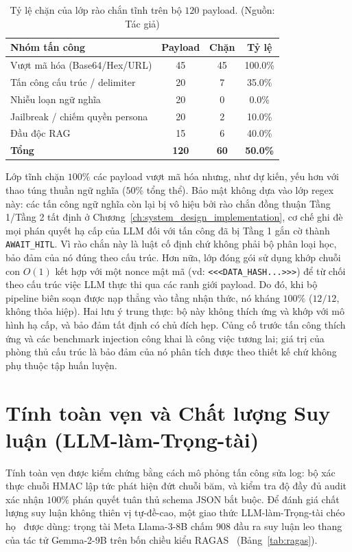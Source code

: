 \begin{table}[!htbp]
    \centering
    \caption{Tỷ lệ chặn của lớp rào chắn tĩnh trên bộ $120$ payload. (Nguồn: Tác giả)}
    \label{tab:robustness}
    \begin{tabular}{|>{\raggedright\arraybackslash}p{}|c|c|c|}
        \hline
        \textbf{Nhóm tấn công} & \textbf{Payload} & \textbf{Chặn} & \textbf{Tỷ lệ} \\ \hline
        Vượt mã hóa (Base64/Hex/URL) & 45 & 45 & 100.0\% \\ \hline
        Tấn công cấu trúc / delimiter & 20 & 7 & 35.0\% \\ \hline
        Nhiễu loạn ngữ nghĩa & 20 & 0 & 0.0\% \\ \hline
        Jailbreak / chiếm quyền persona & 20 & 2 & 10.0\% \\ \hline
        Đầu độc RAG & 15 & 6 & 40.0\% \\ \hline
        \textbf{Tổng} & \textbf{120} & \textbf{60} & \textbf{50.0\%} \\ \hline
    \end{tabular}
\end{table}

Lớp tĩnh chặn $100\%$ các payload vượt mã hóa nhưng, như dự kiến, yếu hơn với thao túng thuần ngữ nghĩa ($50\%$ tổng thể). Bảo mật không dựa vào lớp regex này: các tấn công ngữ nghĩa còn lại bị vô hiệu bởi rào chắn đồng thuận Tầng 1/Tầng 2 tất định ở Chương~\ref{ch:system_design_implementation}, cơ chế ghi đè mọi phán quyết hạ cấp của LLM đối với tấn công đã bị Tầng 1 gắn cờ thành \texttt{AWAIT\_HITL}. Vì rào chắn này là luật cố định chứ không phải bộ phân loại học, bảo đảm của nó đúng theo cấu trúc. Hơn nữa, lớp đóng gói sử dụng khớp chuỗi con $O(1)$ kết hợp với một nonce mật mã (vd: \texttt{<<<DATA\_HASH...>>>}) để từ chối theo cấu trúc việc LLM thực thi qua các ranh giới payload. Do đó, khi bộ pipeline biên soạn được nạp thẳng vào tầng nhận thức, nó kháng $100\%$ ($12/12$, không thỏa hiệp). Hai lưu ý trung thực: bộ này không thích ứng và khớp với mô hình hạ cấp, và bảo đảm tất định có chủ đích hẹp. Củng cố trước tấn công thích ứng và các benchmark injection công khai là công việc tương lai; giá trị của phòng thủ cấu trúc là bảo đảm của nó phân tích được theo thiết kế chứ không phụ thuộc tập huấn luyện.

\section{Tính toàn vẹn và Chất lượng Suy luận (LLM-làm-Trọng-tài)}
Tính toàn vẹn được kiểm chứng bằng cách mô phỏng tấn công sửa log: bộ xác thực chuỗi HMAC lập tức phát hiện đứt chuỗi băm, và kiểm tra độ đầy đủ audit xác nhận $100\%$ phán quyết tuân thủ schema JSON bắt buộc. Để đánh giá chất lượng suy luận không thiên vị tự-đề-cao, một giao thức LLM-làm-Trọng-tài chéo họ~\cite{zheng2023judge} được dùng: trọng tài Meta Llama-3-8B chấm $908$ đầu ra suy luận leo thang của tác tử Gemma-2-9B trên bốn chiều kiểu RAGAS~\cite{ragas2023} (Bảng~\ref{tab:ragas}).

